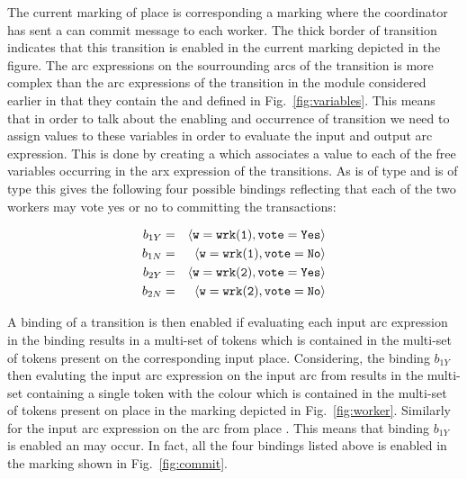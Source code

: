 The current marking of place  is  corresponding a marking where the coordinator has sent
a can commit message to each worker. The thick border of transition
 indicates that this transition is enabled
in the current marking depicted in the figure. The arc expressions on
the sourrounding arcs of the  transition is
more complex than the arc expressions of the 
transition in the  module considered earlier in
that they contain the   and
 defined in Fig.~\ref{fig:variables}. This means that
in order to talk about the enabling and occurrence of transition
 we need to assign values to these variables
in order to evaluate the input and output arc expression. This is done
by creating a  which associates a value to each of
the free variables occurring in the arx expression of the
transitions. As  is of type  and
 is of type  this gives the following
four possible bindings reflecting that each of the two workers may
vote yes or no to committing the transactions:

\begin{eqnarray*}
b_{1Y} & = & \langle {\tt{w}} = {\tt{wrk(1)}}, {\tt{vote}} = {\tt{Yes}} \rangle \\
b_{1N} & = & \langle {\tt{w}} = {\tt{wrk(1)}}, {\tt{vote}} = {\tt{No}} \rangle \\
b_{2Y} & = & \langle {\tt{w}} = {\tt{wrk(2)}}, {\tt{vote}} = {\tt{Yes}} \rangle \\
b_{2N} & = & \langle {\tt{w}} = {\tt{wrk(2)}}, {\tt{vote}} = {\tt{No}} \rangle
\end{eqnarray*}

A binding of a transition is then enabled if evaluating each input arc
expression in the binding results in a multi-set of tokens which is
contained in the multi-set of tokens present on the corresponding
input place. Considering, the binding $b_{1Y}$ then evaluting the
input arc expression  on the input arc from 
results in the multi-set containing a single token with the colour
 which is contained in the multi-set of tokens present
on place  in the marking depicted in
Fig.~\ref{fig:worker}. Similarly for the input arc expression on the
arc from place . This means that binding $b_{1Y}$
is enabled an may occur. In fact, all the four bindings listed above
is enabled in the marking shown in Fig.~\ref{fig:commit}. 

